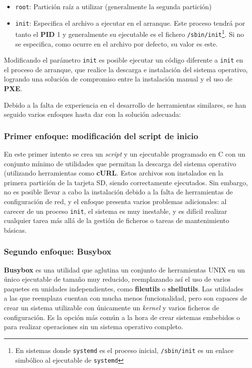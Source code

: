 \documentclass{article}
\begin{document}
\begin{itemize}
	\item \texttt{root}: Partición raíz a utilizar (generalmente la segunda partición)
	\item \texttt{init}: Especifica el archivo a ejecutar en el arranque. Este proceso tendrá por tanto el \textbf{PID} 1 y generalmente su ejecutable es el fichero \texttt{/sbin/init}\footnote{En sistemas donde \texttt{systemd} es el proceso inicial, \texttt{/sbin/init} es un enlace simbólico al ejecutable de \texttt{systemd}}. Si no se especifica, como ocurre en el archivo por defecto, su valor es este\cite{kernelparams:init}.
\end{itemize}

Modificando el parámetro \texttt{init} es posible ejecutar un código diferente a \texttt{init} en el proceso de arranque, que realice la descarga e instalación del sistema operativo, logrando una solución de compromiso entre la instalación manual y el uso de \textbf{PXE}.

Debido a la falta de experiencia en el desarrollo de herramientas similares, se han seguido varios enfoques hasta dar con la solución adecuada:

\subsubsection{Primer enfoque: modificación del script de inicio}

En este primer intento se crea un \textit{script} y un ejecutable programado en C con un conjunto mínimo de utilidades que permitan la descarga del sistema operativo (utilizando herramientas como \textbf{cURL}. Estos archivos son instalados en la primera partición de la tarjeta SD, siendo correctamente ejecutados. Sin embargo, no es posible llevar a cabo la instalación debido a la falta de herramientas de configuración de red, y el enfoque presenta varios problemas adicionales: al carecer de un proceso \texttt{init}, el sistema es muy inestable, y es difícil realizar cualquier tarea más allá de la gestión de ficheros o tareas de mantenimiento básicas.

\subsubsection{Segundo enfoque: Busybox}

\textbf{Busybox} es una utilidad que aglutina un conjunto de herramientas UNIX en un único ejecutable de tamaño muy reducido, reemplazando así el uso de varios paquetes en unidades independientes, como \textbf{fileutils} o \textbf{shellutils}. Las utilidades a las que reemplaza cuentan con mucha menos funcionalidad, pero son capaces de crear un sistema utilizable con únicamente un \textit{kernel} y varios ficheros de configuración\cite{aboutbusybox}. Es la opción más común a la hora de crear sistemas embebidos o para realizar operaciones sin un sistema operativo completo.
\end{document}
